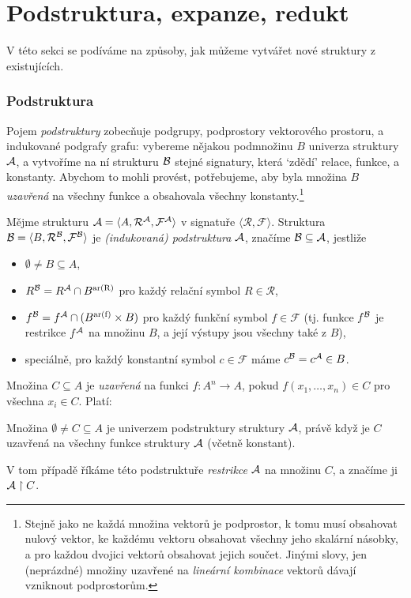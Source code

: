 \section{Podstruktura, expanze, redukt}

V této sekci se podíváme na způsoby, jak můžeme vytvářet nové struktury z existujících.

\subsubsection{Podstruktura}

Pojem \emph{podstruktury} zobecňuje podgrupy, podprostory vektorového prostoru, a indukované podgrafy grafu: vybereme nějakou podmnožinu $B$ univerza struktury $\mathcal{A}$, a vytvoříme na ní strukturu $\mathcal{B}$ stejné signatury, která `zdědí' relace, funkce, a konstanty. Abychom to mohli provést, potřebujeme, aby byla množina $B$ \emph{uzavřená} na všechny funkce a obsahovala všechny konstanty.\footnote{Stejně jako ne každá množina vektorů je podprostor, k tomu musí obsahovat nulový vektor, ke každému vektoru obsahovat všechny jeho skalární násobky, a pro každou dvojici vektorů obsahovat jejich součet. Jinými slovy, jen (neprázdné) množiny uzavřené na \emph{lineární kombinace} vektorů dávají vzniknout podprostorům.}

\begin{definition}[Podstruktura]
Mějme strukturu $\mathcal{A}=\langle A,\mathcal R^\mathcal A,\mathcal F^\mathcal A\rangle$ v signatuře $\langle\mathcal R,\mathcal F\rangle$. Struktura $\mathcal{B}=\langle B,\mathcal R^\mathcal B,\mathcal F^\mathcal B\rangle$ je \emph{(indukovaná) podstruktura $\mathcal{A}$}, značíme $\mathcal{B}\subseteq\mathcal{A}$, jestliže
\begin{itemize}
    \item $\emptyset\neq B\subseteq A$,
    \item $R^{\mathcal{B}}=R^{\mathcal{A}}\cap B^{\mathrm{ar(R)}}$ pro každý relační symbol $R\in \mathcal R$,
    \item $f^{\mathcal{B}}=f^{\mathcal{A}}\cap (B^{\mathrm{ar(f)}}\times B)$ pro každý funkční symbol $f\in \mathcal F$ (tj. funkce $f^{\mathcal{B}}$ je restrikce $f^{\mathcal{A}}$ na množinu $B$, a její výstupy jsou všechny také z $B$),
    \item speciálně, pro každý konstantní symbol $c\in\mathcal F$ máme $c^{\mathcal{B}}=c^{\mathcal{A}}\in B$.
\end{itemize}
\end{definition}
Množina $C\subseteq A$ je \emph{uzavřená} na funkci $f:A^n\to A$, pokud $f(x_1,\dots,x_n)\in C$ pro všechna $x_i\in C$. Platí:
\begin{observation}
    Množina $\emptyset\neq C\subseteq A$ je univerzem podstruktury struktury $\mathcal{A}$, právě když je $C$ uzavřená na všechny funkce struktury $\mathcal{A}$ (včetně konstant).
\end{observation}
V tom případě říkáme této podstruktuře \emph{restrikce} $\mathcal{A}$ na množinu $C$, a značíme ji $\mathcal{A}\restriction C$.

